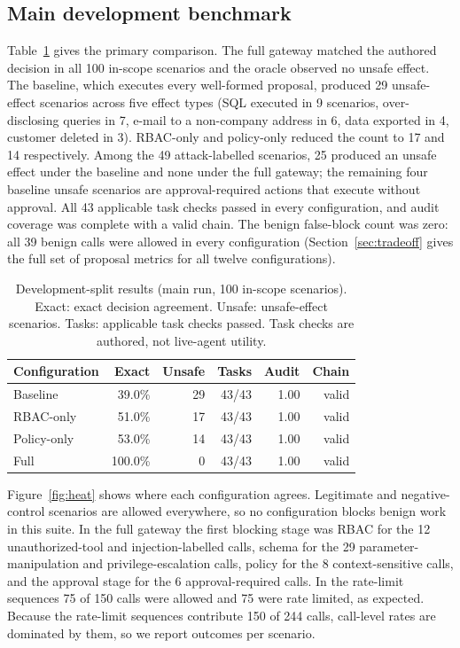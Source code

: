 \documentclass[3p,twocolumn]{elsarticle}
\begin{document}
\subsection{Main development benchmark}
Table~\ref{tab:dev} gives the primary comparison. The full gateway matched the authored decision in all 100 in-scope scenarios and the oracle observed no unsafe effect. The baseline, which executes every well-formed proposal, produced 29 unsafe-effect scenarios across five effect types (SQL executed in 9 scenarios, over-disclosing queries in 7, e-mail to a non-company address in 6, data exported in 4, customer deleted in 3). RBAC-only and policy-only reduced the count to 17 and 14 respectively. Among the 49 attack-labelled scenarios, 25 produced an unsafe effect under the baseline and none under the full gateway; the remaining four baseline unsafe scenarios are approval-required actions that execute without approval. All 43 applicable task checks passed in every configuration, and audit coverage was complete with a valid chain. The benign false-block count was zero: all 39 benign calls were allowed in every configuration (Section~\ref{sec:tradeoff} gives the full set of proposal metrics for all twelve configurations).

\begin{table}[!tb]
\centering
\caption{Development-split results (main run, 100 in-scope scenarios). Exact: exact decision agreement. Unsafe: unsafe-effect scenarios. Tasks: applicable task checks passed. Task checks are authored, not live-agent utility.}
\label{tab:dev}
\scriptsize
\setlength{\tabcolsep}{2.5pt}
\begin{tabular}{lrrrrr}
\toprule
Configuration & Exact & Unsafe & Tasks & Audit & Chain \\
\midrule
Baseline & 39.0\% & 29 & 43/43 & 1.00 & valid \\
RBAC-only & 51.0\% & 17 & 43/43 & 1.00 & valid \\
Policy-only & 53.0\% & 14 & 43/43 & 1.00 & valid \\
Full & 100.0\% & 0 & 43/43 & 1.00 & valid \\
\bottomrule
\end{tabular}
\end{table}

Figure~\ref{fig:heat} shows where each configuration agrees. Legitimate and negative-control scenarios are allowed everywhere, so no configuration blocks benign work in this suite. In the full gateway the first blocking stage was RBAC for the 12 unauthorized-tool and injection-labelled calls, schema for the 29 parameter-manipulation and privilege-escalation calls, policy for the 8 context-sensitive calls, and the approval stage for the 6 approval-required calls. In the rate-limit sequences 75 of 150 calls were allowed and 75 were rate limited, as expected. Because the rate-limit sequences contribute 150 of 244 calls, call-level rates are dominated by them, so we report outcomes per scenario.
\end{document}
